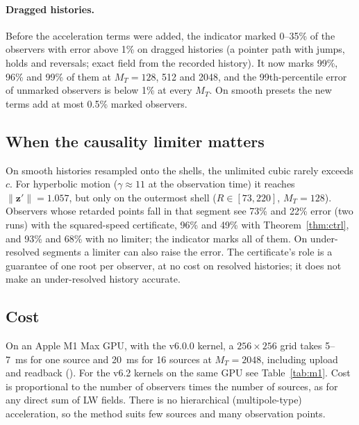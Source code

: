 \documentclass[11pt, a4paper]{article}
\begin{document}
\paragraph{Dragged histories.} Before the acceleration terms were added, the indicator marked 0--35\% of the observers with error above 1\% on dragged histories (a pointer path with jumps, holds and reversals; exact field from the recorded history). It now marks 99\%, 96\% and 99\% of them at $M_T = 128$, 512 and 2048, and the 99th-percentile error of unmarked observers is below 1\% at every $M_T$. On smooth presets the new terms add at most 0.5\% marked observers.

\subsection{When the causality limiter matters}
On smooth histories resampled onto the shells, the unlimited cubic rarely exceeds $c$. For hyperbolic motion ($\gamma \approx 11$ at the observation time) it reaches $\|\mathbf{z}'\| = 1.057$, but only on the outermost shell ($R \in [73, 220]$, $M_T = 128$). Observers whose retarded points fall in that segment see 73\% and 22\% error (two runs) with the squared-speed certificate, 96\% and 49\% with Theorem~\ref{thm:ctrl}, and 93\% and 68\% with no limiter; the indicator marks all of them. On under-resolved segments a limiter can also raise the error. The certificate's role is a guarantee of one root per observer, at no cost on resolved histories; it does not make an under-resolved history accurate.

\subsection{Cost}
On an Apple M1 Max GPU, with the v6.0.0 kernel, a $256 \times 256$ grid takes 5--7~ms for one source and 20~ms for 16 sources at $M_T = 2048$, including upload and readback (). For the v6.2 kernels on the same GPU see Table~\ref{tab:m1}. Cost is proportional to the number of observers times the number of sources, as for any direct sum of LW fields. There is no hierarchical (multipole-type) acceleration, so the method suits few sources and many observation points.
\end{document}

